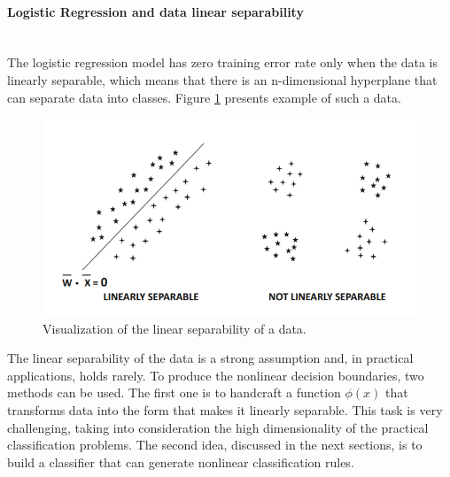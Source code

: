 \paragraph{Logistic Regression and data linear separability} \mbox{}
\\

The logistic regression model has zero training error rate only when the data is linearly separable, which means that there is an n-dimensional hyperplane that can separate data into classes. Figure \ref{fig:linear separability} presents example of such a data.



\begin{figure}[!h]
\centering
\includegraphics{figures/limear_separability.PNG}
\caption{Visualization of the linear separability of a data.  
\label{fig:linear separability}}
\end{figure}


The linear separability of the data is a strong assumption and, in practical applications, holds rarely. To produce the nonlinear decision boundaries, two methods can be used. The first one is to handcraft a function $\phi(x)$ that transforms data into the form that makes it linearly separable. This task is very challenging, taking into consideration the high dimensionality of the practical classification problems. The second idea, discussed in the next sections, is to build a classifier that can generate nonlinear classification rules. 

